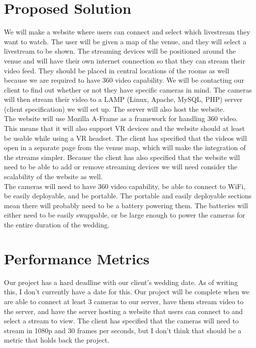 \documentclass[10pt,draftclsnofoot,onecolumn]{IEEEtran}
\begin{document}
\section{Proposed Solution}
We will make a website where users can connect and select which livestream they want to watch. The user will be given a map of the venue, and they will select a livestream to be shown. The streaming devices will be positioned around the venue and will have their own internet connection so that they can stream their video feed. They should be placed in central locations of the rooms as well because we are required to have 360 video capability. We will be contacting our client to find out whether or not they have specific cameras in mind. The cameras will then stream their video to a LAMP (Linux, Apache, MySQL, PHP) server (client specification) we will set up. The server will also host the website.\\
The website will use Mozilla A-Frame as a framework for handling 360 video. This means that it will also support VR devices and the website should at least be usable while using a VR headset. The client has specified that the videos will open in a separate page from the venue map, which will make the integration of the streams simpler. Because the client has also specified that the website will need to be able to add or remove streaming devices we will need consider the scalability of the website as well.\\
The cameras will need to have 360 video capability, be able to connect to WiFi, be easily deployable, and be portable. The portable and easily deployable sections mean there will probably need to be a battery powering them. The batteries will either need to be easily swappable, or be large enough to power the cameras for the entire duration of the wedding.
\section{Performance Metrics}
Our project has a hard deadline with our client's wedding date. As of writing this, I don't currently have a date for this. Our project will be complete when we are able to connect at least 3 cameras to our server, have them stream video to the server, and have the server hosting a website that users can connect to and select a stream to view. The client has specified that the cameras will need to stream in 1080p and 30 frames per seconds, but I don't think that should be a metric that holds back the project.
\end{document}
